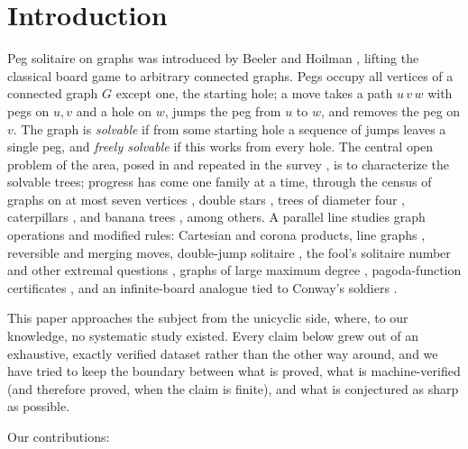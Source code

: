 \documentclass[11pt]{article}
\theoremstyle{definition}
\begin{document}
\section{Introduction}

Peg solitaire on graphs was introduced by Beeler and Hoilman
\cite{BH11}, lifting the classical board game \cite{Beasley,BCG,Bell}
to arbitrary connected graphs. Pegs occupy all vertices of a
connected graph $G$ except one, the starting hole; a move takes a
path $u\,v\,w$ with pegs on $u,v$ and a hole on $w$, jumps the peg
from $u$ to $w$, and removes the peg on $v$. The graph is
\emph{solvable} if from some starting hole a sequence of jumps leaves
a single peg, and \emph{freely solvable} if this works from every
hole. The central open problem of the area, posed in \cite{BH11} and
repeated in the survey \cite{dWK23}, is to characterize the solvable
trees; progress has come one family at a time, through the census of
graphs on at most seven vertices \cite{BG12}, double stars
\cite{BH12}, trees of diameter four \cite{BW15}, caterpillars
\cite{BGH17}, and banana trees \cite{dWK20}, among others. A parallel
line studies graph operations and modified rules: Cartesian
\cite{KdWcart} and corona \cite{KdWcorona} products, line graphs
\cite{KdWline}, reversible \cite{ES} and merging \cite{EW} moves,
double-jump solitaire \cite{BGdj}, the fool's solitaire number and
other extremal questions \cite{BR12,BGext}, graphs of large maximum
degree \cite{Mat}, pagoda-function certificates \cite{Kpagoda}, and
an infinite-board analogue tied to Conway's soldiers \cite{Vito}.

This paper approaches the subject from the unicyclic side, where, to
our knowledge, no systematic study existed. Every claim below grew
out of an exhaustive, exactly verified dataset rather than the other
way around, and we have tried to keep the boundary between what is
proved, what is machine-verified (and therefore proved, when the
claim is finite), and what is conjectured as sharp as possible.

Our contributions:
\end{document}
